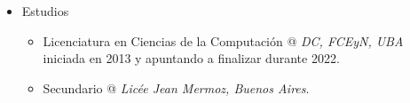 \documentclass[a4paper]{article}
\begin{document}
\begin{itemize}
\begin{itemize}
    \item
      Interés en aplicar y estudiar buenas prácticas de programación y
      desarrollo de software. \newline
      Conocimiento vago pero diario de sistemas \texttt{Unix}.

    \item
      Inglés (uso diario a través de estudio y ocio) y Francés (escolaridad).

  \end{itemize}

  \item Estudios
  \begin{itemize}

    \item
      Licenciatura en Ciencias de la Computación @ \textit{DC, FCEyN, UBA}
      iniciada en 2013 y apuntando a finalizar durante 2022.

    \item
      Secundario @ \textit{Licée Jean Mermoz, Buenos Aires}.

  \end{itemize}

\end{itemize}
\end{document}
